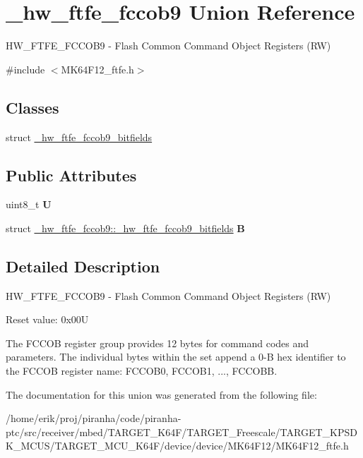 \hypertarget{union__hw__ftfe__fccob9}{}\section{\+\_\+hw\+\_\+ftfe\+\_\+fccob9 Union Reference}
\label{union__hw__ftfe__fccob9}


H\+W\+\_\+\+F\+T\+F\+E\+\_\+\+F\+C\+C\+O\+B9 -\/ Flash Common Command Object Registers (RW)  




{\ttfamily \#include $<$M\+K64\+F12\+\_\+ftfe.\+h$>$}

\subsection*{Classes}
\begin{DoxyCompactItemize}
\item 
struct \hyperlink{struct__hw__ftfe__fccob9_1_1__hw__ftfe__fccob9__bitfields}{\+\_\+hw\+\_\+ftfe\+\_\+fccob9\+\_\+bitfields}
\end{DoxyCompactItemize}
\subsection*{Public Attributes}
\begin{DoxyCompactItemize}
\item 
uint8\+\_\+t {\bfseries U}\hypertarget{union__hw__ftfe__fccob9_a4e204be2ed2abd7654b4d5086e4511bb}{}\label{union__hw__ftfe__fccob9_a4e204be2ed2abd7654b4d5086e4511bb}

\item 
struct \hyperlink{struct__hw__ftfe__fccob9_1_1__hw__ftfe__fccob9__bitfields}{\+\_\+hw\+\_\+ftfe\+\_\+fccob9\+::\+\_\+hw\+\_\+ftfe\+\_\+fccob9\+\_\+bitfields} {\bfseries B}\hypertarget{union__hw__ftfe__fccob9_a32949481f3a5381f86d1215f848b6a7c}{}\label{union__hw__ftfe__fccob9_a32949481f3a5381f86d1215f848b6a7c}

\end{DoxyCompactItemize}


\subsection{Detailed Description}
H\+W\+\_\+\+F\+T\+F\+E\+\_\+\+F\+C\+C\+O\+B9 -\/ Flash Common Command Object Registers (RW) 

Reset value\+: 0x00U

The F\+C\+C\+OB register group provides 12 bytes for command codes and parameters. The individual bytes within the set append a 0-\/B hex identifier to the F\+C\+C\+OB register name\+: F\+C\+C\+O\+B0, F\+C\+C\+O\+B1, ..., F\+C\+C\+O\+BB. 

The documentation for this union was generated from the following file\+:\begin{DoxyCompactItemize}
\item 
/home/erik/proj/piranha/code/piranha-\/ptc/src/receiver/mbed/\+T\+A\+R\+G\+E\+T\+\_\+\+K64\+F/\+T\+A\+R\+G\+E\+T\+\_\+\+Freescale/\+T\+A\+R\+G\+E\+T\+\_\+\+K\+P\+S\+D\+K\+\_\+\+M\+C\+U\+S/\+T\+A\+R\+G\+E\+T\+\_\+\+M\+C\+U\+\_\+\+K64\+F/device/device/\+M\+K64\+F12/M\+K64\+F12\+\_\+ftfe.\+h\end{DoxyCompactItemize}
